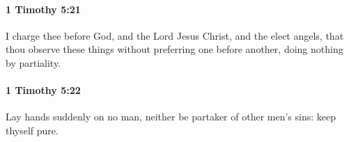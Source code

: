 		\paragraph{1 Timothy 5:21} %
			\label{1TIMOTHY-5-21}

			I charge thee before God, and the Lord Jesus Christ, and the elect angels, that thou observe these things without preferring one before another, doing nothing by partiality.

			\begin{framed}
			\scriptsize
				\begin{compactdesc}
					\item[SBLG] 
				\end{compactdesc}
			\end{framed}

		\paragraph{1 Timothy 5:22} %
			\label{1TIMOTHY-5-22}

			Lay hands suddenly on no man, neither be partaker of other men's sins: keep thyself pure.

